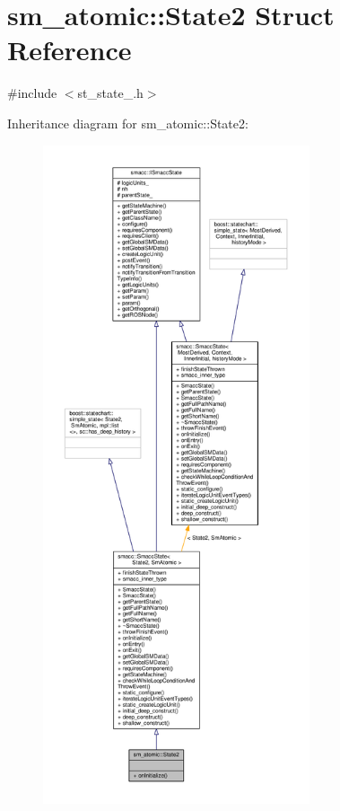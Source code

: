 \hypertarget{structsm__atomic_1_1State2}{}\section{sm\+\_\+atomic\+:\+:State2 Struct Reference}
\label{structsm__atomic_1_1State2}


{\ttfamily \#include $<$st\+\_\+state\+\_.\+h$>$}



Inheritance diagram for sm\+\_\+atomic\+:\+:State2\+:\nopagebreak
\begin{figure}[H]
\begin{center}
\leavevmode
\includegraphics[height=550pt]{structsm__atomic_1_1State2__inherit__graph}
\end{center}
\end{figure}


